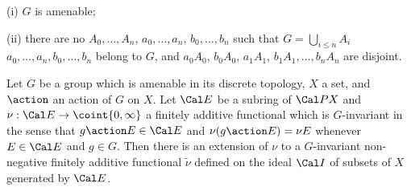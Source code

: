 (i) $G$ is amenable;

(ii) there are no
$A_0,\ldots,A_n$, $a_0,\ldots,a_n$, $b_0,\ldots,b_n$ such that
$G=\bigcup_{i\le n}A_i$
$a_0,\ldots,a_n,b_0,\ldots,b_n$ belong to $G$, and $a_0A_0$,
$b_0A_0$, $a_1A_1$,
$b_1A_1,\ldots,b_nA_n$ are disjoint.


 Let $G$ be a group which is amenable in its
discrete topology, $X$ a set, and $\action$ an action of $G$ on $X$.
Let $\Cal E$ be a subring of $\Cal PX$ and
$\nu:\Cal E\to\coint{0,\infty}$ a finitely additive functional which
is $G$-invariant in the sense that $g\action E\in\Cal E$ and
$\nu(g\action E)=\nu E$ whenever $E\in\Cal E$ and $g\in G$.   Then
there is an extension of $\nu$ to a $G$-invariant non-negative finitely
additive functional $\tilde\nu$ defined on the ideal $\Cal I$ of
subsets of $X$ generated by $\Cal E$.

